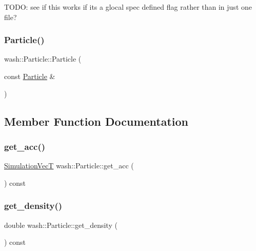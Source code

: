 T\+O\+DO\+: see if this works if it\textquotesingle{}s a glocal spec defined flag rather than in just one file? 

\mbox{\label{classwash_1_1Particle_a9ca04366cb7412e6aa5d1d89108a8520}} 
\subsubsection{\texorpdfstring{Particle()}{Particle()}\hspace{0.1cm}{\footnotesize\ttfamily [2/2]}}
{\footnotesize\ttfamily wash\+::\+Particle\+::\+Particle (\begin{DoxyParamCaption}\item[{const \mbox{\hyperlink{classwash_1_1Particle}{Particle}} \&}]{ }\end{DoxyParamCaption})\hspace{0.3cm}{\ttfamily [delete]}}



\subsection{Member Function Documentation}
\mbox{\label{classwash_1_1Particle_afb8c9dce2692cdfab61a3a87fde50610}} 
\subsubsection{\texorpdfstring{get\+\_\+acc()}{get\_acc()}}
{\footnotesize\ttfamily \mbox{\hyperlink{namespacewash_ab2cbbc37941b733095c9225b49b4cad9}{Simulation\+VecT}} wash\+::\+Particle\+::get\+\_\+acc (\begin{DoxyParamCaption}{ }\end{DoxyParamCaption}) const}

\mbox{\label{classwash_1_1Particle_a8c0ce3f48b189fd8550c3bfab17eec68}} 
\subsubsection{\texorpdfstring{get\+\_\+density()}{get\_density()}}
{\footnotesize\ttfamily double wash\+::\+Particle\+::get\+\_\+density (\begin{DoxyParamCaption}{ }\end{DoxyParamCaption}) const}

